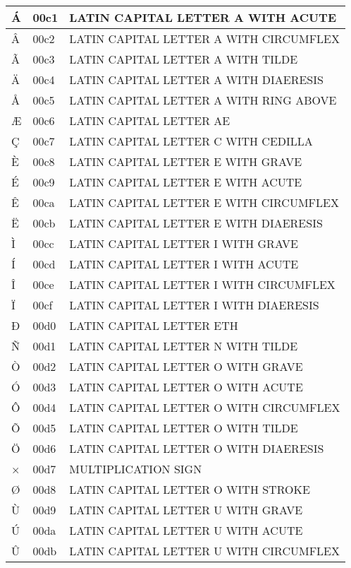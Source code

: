 \documentclass[12pt,letterpaper,openany]{book}
\begin{document}
\begin{center}
\begin{supertabular}{|m{0.25in}|m{0.5in}|m{4in}|}
			Á & 00c1 & LATIN CAPITAL LETTER A WITH ACUTE\\\hline
			Â & 00c2 & LATIN CAPITAL LETTER A WITH CIRCUMFLEX\\\hline
			Ã & 00c3 & LATIN CAPITAL LETTER A WITH TILDE\\\hline
			Ä & 00c4 & LATIN CAPITAL LETTER A WITH DIAERESIS\\\hline
			Å & 00c5 & LATIN CAPITAL LETTER A WITH RING ABOVE\\\hline
			Æ & 00c6 & LATIN CAPITAL LETTER AE\\\hline
			Ç & 00c7 & LATIN CAPITAL LETTER C WITH CEDILLA\\\hline
			È & 00c8 & LATIN CAPITAL LETTER E WITH GRAVE\\\hline
			É & 00c9 & LATIN CAPITAL LETTER E WITH ACUTE\\\hline
			Ê & 00ca & LATIN CAPITAL LETTER E WITH CIRCUMFLEX\\\hline
			Ë & 00cb & LATIN CAPITAL LETTER E WITH DIAERESIS\\\hline
			Ì & 00cc & LATIN CAPITAL LETTER I WITH GRAVE\\\hline
			Í & 00cd & LATIN CAPITAL LETTER I WITH ACUTE\\\hline
			Î & 00ce & LATIN CAPITAL LETTER I WITH CIRCUMFLEX\\\hline
			Ï & 00cf & LATIN CAPITAL LETTER I WITH DIAERESIS\\\hline
			Ð & 00d0 & LATIN CAPITAL LETTER ETH\\\hline
			Ñ & 00d1 & LATIN CAPITAL LETTER N WITH TILDE\\\hline
			Ò & 00d2 & LATIN CAPITAL LETTER O WITH GRAVE\\\hline
			Ó & 00d3 & LATIN CAPITAL LETTER O WITH ACUTE\\\hline
			Ô & 00d4 & LATIN CAPITAL LETTER O WITH CIRCUMFLEX\\\hline
			Õ & 00d5 & LATIN CAPITAL LETTER O WITH TILDE\\\hline
			Ö & 00d6 & LATIN CAPITAL LETTER O WITH DIAERESIS\\\hline
			× & 00d7 & MULTIPLICATION SIGN\\\hline
			Ø & 00d8 & LATIN CAPITAL LETTER O WITH STROKE\\\hline
			Ù & 00d9 & LATIN CAPITAL LETTER U WITH GRAVE\\\hline
			Ú & 00da & LATIN CAPITAL LETTER U WITH ACUTE\\\hline
			Û & 00db & LATIN CAPITAL LETTER U WITH CIRCUMFLEX\\\hline

\end{supertabular}
\end{center}
\end{document}
